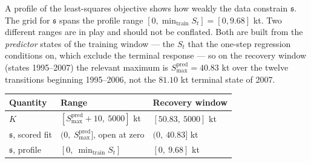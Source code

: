 \documentclass[11pt]{article}
\begin{document}
A profile of the least-squares objective shows how weakly the data
constrain \(\mathfrak s\). The grid for \(\mathfrak s\) spans the profile range
\([0, \min_{\mathrm{train}} S_t] = [0, 9.68]\) kt. Two different ranges are in play and should not be conflated. Both are
built from the \emph{predictor} states of the training window --- the
\(S_t\) that the one-step regression conditions on, which exclude the
terminal response --- so on the recovery window (states 1995--2007) the
relevant maximum is \(S^{\mathrm{pred}}_{\max} = 40.83\) kt over the
twelve transitions beginning 1995--2006, not the \(81.10\) kt terminal
state of 2007.

\begin{longtable}[]{@{}lll@{}}
\toprule\noalign{}
Quantity & Range & Recovery window \\
\midrule\noalign{}
\endhead
\bottomrule\noalign{}
\endlastfoot
\(K\) & \([S^{\mathrm{pred}}_{\max}+10,\ 5000]\) kt & \([50.83,\ 5000]\) kt \\
\(\mathfrak s\), scored fit & \((0,\ S^{\mathrm{pred}}_{\max}]\), open at zero & \((0,\ 40.83]\) kt \\
\(\mathfrak s\), profile & \([0,\ \min_{\mathrm{train}} S_t]\) & \([0,\ 9.68]\) kt \\
\end{longtable}
\end{document}
